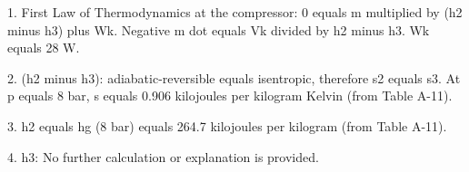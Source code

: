 1. First Law of Thermodynamics at the compressor:  
0 equals m multiplied by (h2 minus h3) plus Wk.  
Negative m dot equals Vk divided by h2 minus h3.  
Wk equals 28 W.  

2. (h2 minus h3): adiabatic-reversible equals isentropic, therefore s2 equals s3.  
At p equals 8 bar, s equals 0.906 kilojoules per kilogram Kelvin (from Table A-11).  

3. h2 equals hg (8 bar) equals 264.7 kilojoules per kilogram (from Table A-11).  

4. h3:  
No further calculation or explanation is provided.